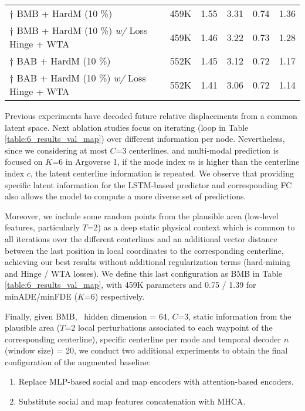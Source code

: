 \begin{table}[]
{\begin{tabular}{lccccc}
			\midrule
			$\dag$ \ac{BMB} + \ac{HardM} (10 \%)  & 459K  & 1.55 & 3.31 & 0.74 & 1.36 \\
			$\dag$ \ac{BMB} + \ac{HardM} (10 \%) \emph{w/} Loss Hinge + \ac{WTA} &  459K  & 1.46 & 3.22 & 0.73 & 1.28 \\
			$\dag$ \acs{BAB} + \ac{HardM} (10 \%)  & 552K  & 1.45 & 3.12 & 0.72 & 1.17 \\
			$\dag$ \ac{BAB} + \ac{HardM} (10 \%) \emph{w/} Loss Hinge + \ac{WTA} &  552K  & 1.41 & 3.06 & 0.72 & 1.14 \\
			\bottomrule
	\end{tabular}}
\end{table}

Previous experiments have decoded future relative displacements from a common latent space. Next ablation studies focus on iterating (loop in Table \ref{table:6_results_val_map}) over different information per node. Nevertheless, since we considering at most $C$=3 centerlines, and multi-modal prediction is focused on $K$=6 in Argoverse 1, if the mode index $m$ is higher than the centerline index $c$, the latent centerline information is repeated. We observe that providing specific latent information for the \ac{LSTM}-based predictor and corresponding \ac{FC} also allows the model to compute a more diverse set of predictions. 

Moreover, we include some random points from the plausible area (low-level features, particularly $T$=2) as a deep static physical context which is common to all iterations over the different centerlines and an additional vector distance between the last position in local coordinates to the corresponding centerline, achieving our best results without additional regularization terms (hard-mining and Hinge / \ac{WTA} losses). We define this last configuration as \acf{BMB} in Table \ref{table:6_results_val_map}, with 459K parameters and 0.75 / 1.39 for \ac{minADE}/\ac{minFDE} ($K$=6) respectively.  

Finally, given \ac{BMB}, \ie \ hidden dimension = 64, $C$=3, static information from the plausible area ($T$=2 local perturbations associated to each waypoint of the corresponding centerline), specific centerline per mode and temporal decoder $n$ (window size) = 20, we conduct two additional experiments to obtain the final configuration of the augmented baseline:

\begin{enumerate}
	
	\item Replace \ac{MLP}-based social and map encoders with attention-based encoders.
	
	\item Substitute social and map features concatenation with \ac{MHCA}.
	
\end{enumerate}

